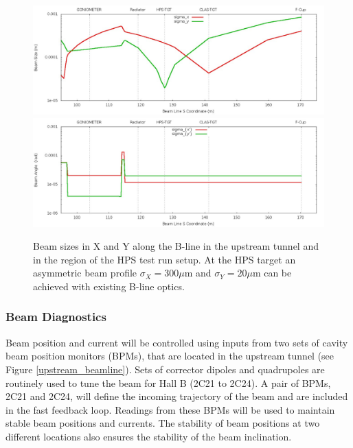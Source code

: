   \begin{figure}[t]
\includegraphics[scale=0.35]{beamline/hps2014_beamsize.jpg}
\includegraphics[scale=0.35]{beamline/hps2014_beamangle.jpg}
\caption{\small{Beam sizes in X and Y along the B-line in the upstream tunnel and in the region of the HPS test run setup. At the HPS target an 
asymmetric beam profile $\sigma_X=300 \mu$m and $\sigma_Y=20 \mu$m can be achieved with existing B-line optics.}}\label{fig:hps2014}
\end{figure}


 
 \subsubsection{Beam Diagnostics}
 \label{setup:beam_dignostics}
 
Beam position and current will be controlled using inputs from two sets of cavity beam position monitors (BPMs), that are located in the 
upstream tunnel (see Figure \ref{upstream_beamline}). 
Sets of corrector dipoles and quadrupoles are routinely used to tune the beam for Hall B (2C21 to 2C24). A pair of BPMs, 2C21 and 2C24, 
will define the incoming trajectory of the beam and are included in the fast feedback loop. Readings from these BPMs will be used to 
maintain stable beam positions and currents. The stability of beam positions at two different locations also ensures the stability of the 
beam inclination.
 

